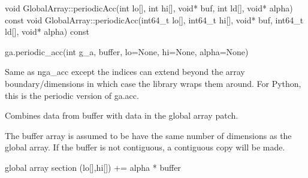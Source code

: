 \documentclass[10pt]{article}
\begin{document}
\begin{cxxapi}
\begin{cxxcode}
void GlobalArray::periodicAcc(int lo[], int hi[], void* buf,
                              int ld[], void* alpha) const
void GlobalArray::periodicAcc(int64_t lo[], int64_t hi[], void* buf,
                              int64_t ld[], void* alpha) const
\end{cxxcode}
\begin{funcargs}
\end{funcargs}
\end{cxxapi}

\begin{pyapi}
\begin{pycode}
ga.periodic_acc(int g_a, buffer, lo=None, hi=None, alpha=None)
\end{pycode}
\begin{funcargs}
\end{funcargs}
\end{pyapi}

\ncoll

\begin{desc}

Same as nga_acc except the indices can extend beyond the array
boundary/dimensions in which case the library wraps them around. For Python,
this is the periodic version of ga.acc.

Combines data from buffer with data in the global array patch.

The buffer array is assumed to be have the same number of dimensions as the
global array. If the buffer is not contiguous, a contiguous copy will be made.

global array section (lo[],hi[]) += alpha * buffer

\end{desc}


\end{document}
